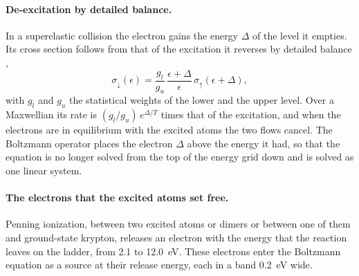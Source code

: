 \documentclass[11pt]{article}
\begin{document}
\paragraph{De-excitation by detailed balance.}
In a superelastic collision the electron gains the energy $\Delta$ of the level it empties. Its cross section
follows from that of the excitation it reverses by detailed balance \cite{KR1921},
\begin{equation}
\sigma_{\downarrow}(\epsilon)=\frac{g_l}{g_u}\,\frac{\epsilon+\Delta}{\epsilon}\,\sigma_{\uparrow}(\epsilon+\Delta),
\label{eq:db}
\end{equation}
with $g_l$ and $g_u$ the statistical weights of the lower and the upper level. Over a Maxwellian its rate is
$(g_l/g_u)\,e^{\Delta/T}$ times that of the excitation, and when the electrons are in equilibrium with the excited
atoms the two flows cancel. The Boltzmann operator places the electron $\Delta$ above the energy it had, so that
the equation is no longer solved from the top of the energy grid down and is solved as one linear system.

\paragraph{The electrons that the excited atoms set free.}
Penning ionization, between two excited atoms or dimers or between one of them and ground-state krypton, releases
an electron with the energy that the reaction leaves on the ladder, from 2.1 to 12.0~eV. These electrons enter the
Boltzmann equation as a source at their release energy, each in a band 0.2~eV wide.
\end{document}
